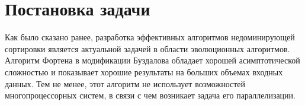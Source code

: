 

\section{Постановка задачи}
Как было сказано ранее, разработка эффективных алгоритмов недоминирующей сортировки является актуальной задачей в области эволюционных алгоритмов. Алгоритм Фортена в модификации Буздалова обладает хорошей асимптотической сложностью и показывает хорошие результаты на больших объемах входных данных. Тем не менее, этот алгоритм не использует возможностей многопроцессорных систем, в связи с чем возникает задача его параллелизации.
